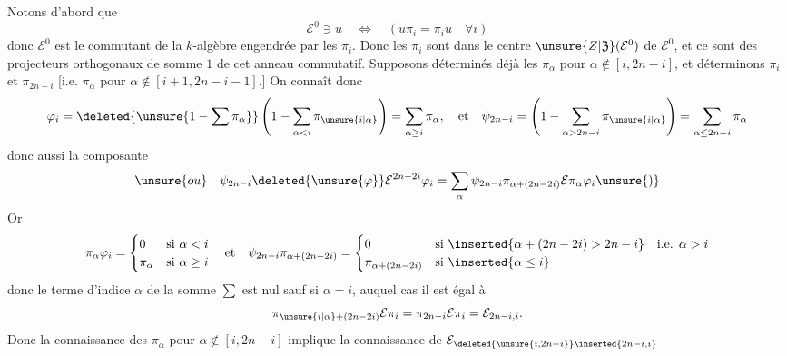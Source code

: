 Notons d'abord que
\[
\mathcal E^0\ni u\quad\Longleftrightarrow\quad(u\pi_i=\pi_i u\quad\forall i)
\]
donc $\mathcal E^0$ est le commutant de la $k$-algèbre engendrée par les $\pi_i$. Donc les $\pi_i$ sont dans le centre $\unsure{Z|\mathfrak Z}(\mathcal E^0)$ de $\mathcal E^0$, et ce sont des projecteurs  orthogonaux de somme $1$ de cet anneau commutatif. Supposons déterminés déjà les $\pi_\alpha$ pour $\alpha\notin[i,2n-i]$,  et déterminons $\pi_i$ et $\pi_{2n-i}$ [i.e. $\pi_\alpha$ pour $\alpha\notin[i+1,2n-i-1]$.]
On connaît donc
\[
\varphi_i=\deleted{\unsure{1-\sum\pi_\alpha}}\left(1-\sum_{\alpha<i}\pi_{\unsure{i|\alpha}}\right)=\sum_{\alpha\geq i}\pi_\alpha,
\quad\text{et}\quad
\psi_{2n-i}=\left(1-\sum_{\alpha>2n-i}\pi_{\unsure{i|\alpha}}\right)=\sum_{\alpha\leq 2n-i}\pi_\alpha
\]
donc aussi la composante
\[
\unsure{ou}\quad\psi_{2n-i}\deleted{\unsure{\varphi}}\mathcal E^{2n-2i}\varphi_i
=\sum_\alpha\psi_{2n-i}\pi_{\alpha+(2n-2i)}\mathcal E\pi_\alpha\varphi_i\unsure{)}
\]
Or
\[
\pi_\alpha\varphi_i=\begin{cases}0&\text{si }\alpha<i\\\pi_\alpha&\text{si }\alpha\geq i\end{cases}
\quad\text{et}\quad
\psi_{2n-i}\pi_{\alpha+(2n-2i)}=
\begin{cases}
0&\text{si }\inserted{\alpha+(2n-2i)>2n-i}\quad\text{i.e. }\alpha>i\\
\pi_{\alpha+(2n-2i)}&\text{si }\inserted{\alpha\leq i}
\end{cases}
\]
donc le terme d'indice $\alpha$ de la somme $\sum$ est nul sauf si $\alpha=i$, auquel cas il est égal à
\[
\pi_{\unsure{i|\alpha}+(2n-2i)}\mathcal E\pi_i=\pi_{2n-i}\mathcal E\pi_i=\mathcal E_{2n-i,i}.
\]
Donc la connaissance des $\pi_\alpha$ pour $\alpha\notin[i,2n-i]$ implique la connaissance de $\mathcal E_{\deleted{\unsure{i,2n-i}}\inserted{2n-i,i}}$ 

